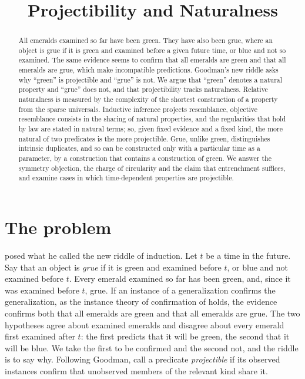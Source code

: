\documentclass{situationist-preprint}
\title{Projectibility and Naturalness}
\begin{document}
\maketitle

\begin{abstract}
All emeralds examined so far have been green. They have also been grue, where an object is grue if it is green and examined before a given future time, or blue and not so examined. The same evidence seems to confirm that all emeralds are green and that all emeralds are grue, which make incompatible predictions. Goodman's new riddle asks why \enquote{green} is projectible and \enquote{grue} is not. We argue that \enquote{green} denotes a natural property and \enquote{grue} does not, and that projectibility tracks naturalness. Relative naturalness is measured by the complexity of the shortest construction of a property from the sparse universals. Inductive inference projects resemblance, objective resemblance consists in the sharing of natural properties, and the regularities that hold by law are stated in natural terms; so, given fixed evidence and a fixed kind, the more natural of two predicates is the more projectible. Grue, unlike green, distinguishes intrinsic duplicates, and so can be constructed only with a particular time as a parameter, by a construction that contains a construction of green. We answer the symmetry objection, the charge of circularity and the claim that entrenchment suffices, and examine cases in which time-dependent properties are projectible.
\end{abstract}

\section{The problem}

\citet{Goodman1946,Goodman1955} posed what he called the new riddle of induction. Let $t$ be a time in the future. Say that an object is \emph{grue} if it is green and examined before $t$, or blue and not examined before $t$. Every emerald examined so far has been green, and, since it was examined before $t$, grue. If an instance of a generalization confirms the generalization, as the instance theory of confirmation of \citet{Hempel1945} holds, the evidence confirms both that all emeralds are green and that all emeralds are grue. The two hypotheses agree about examined emeralds and disagree about every emerald first examined after $t$: the first predicts that it will be green, the second that it will be blue. We take the first to be confirmed and the second not, and the riddle is to say why. Following Goodman, call a predicate \emph{projectible} if its observed instances confirm that unobserved members of the relevant kind share it.
\end{document}
